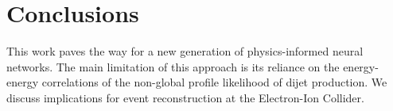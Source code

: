 \section{Conclusions}\label{sec:conclusions}

This work paves the way for a new generation of physics-informed neural
networks. The main limitation of this approach is its reliance on the
energy-energy correlations of the non-global profile likelihood of dijet
production. We discuss implications for event reconstruction at the
Electron-Ion Collider.

